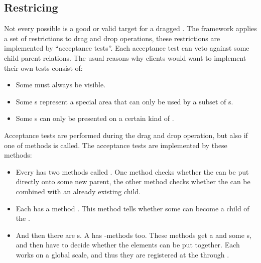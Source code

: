 
\subsection{Restricing}
Not every possible  is a good or valid target for a dragged . The framework applies a set of restrictions to drag and drop operations, these restrictions are implemented by ``acceptance tests''. Each acceptance test can veto against some child parent relations. The usual reasons why clients would want to implement their own tests consist of:
\begin{itemize}
 \item Some  must always be visible.
 \item Some s represent a special area that can only be used by a subset of s.
 \item Some s can only be presented on a certain kind of .
\end{itemize}

Acceptance tests are performed during the drag and drop operation, but also if one of  methods is called. The acceptance tests are implemented by these methods:
\begin{itemize}
 \item Every  has two methods called . One method checks whether the  can be put directly onto some new parent, the other method checks whether the  can be combined with an already existing child.
 \item Each  has a method . This method tells whether some  can become a child of the .
 \item And then there are s. A  has -methods too. These methods get a  and some s, and then have to decide whether the elements can be put together. Each  works on a global scale, and thus they are registered at the  through .
\end{itemize}


